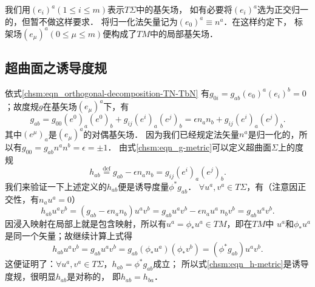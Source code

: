 

我们用$(e_i)^a (1\leqslant i \leqslant m)$表示$T\Sigma$中的基矢场，
如有必要将$(e_i)^a$选为正交归一的，但暂不做这样要求．
将归一化法矢量记为$(e_0)^a\equiv {n}^a$．在这样约定下，
标架场$(e_\mu)^a (0\leqslant \mu \leqslant m)$便构成了$TM$中的局部基矢场．




\subsection{超曲面之诱导度规}
依式\eqref{chsm:eqn_orthogonal-decomposition-TN-TbN}
有$g_{0i}={g}_{ab}(e_0)^a (e_i)^b=0$；故度规$g$在基矢场$(e_\mu)^a$下，有
\begin{equation}\label{chsm:eqn_g-metric}
    g_{ab}= g_{00} (e^0)_a(e^0)_b + g_{ij} (e^i)_a(e^j)_b
    = \epsilon n_a n_b + g_{ij} (e^i)_a(e^j)_b.
\end{equation}
其中$(e^\mu)_a$是$(e_\mu)^a$的对偶基矢场．
因为我们已经规定法矢量${n}^a$是归一化的，所以有$g_{00}={g}_{ab}{n}^a {n}^b=\epsilon=\pm 1$．
由式\eqref{chsm:eqn_g-metric}可以定义超曲面$\Sigma$上的度规
\begin{equation}\label{chsm:eqn_h-metric}
    h_{ab} \overset{\mathrm {def}}{=} g_{ab}- \epsilon {n}_a {n}_b = g_{ij} (e^i)_a(e^j)_b.
\end{equation}
我们来验证一下上述定义的$h_{ab}$便是诱导度量$\phi^* g_{ab}$．
$\forall u^a, v^a \in T\Sigma$，有（注意因正交性，有${n}_au^a=0$）
\begin{equation}
    h_{ab}u^a v^b = (g_{ab}-\epsilon{n}_a {n}_b)u^a v^b
      =  g_{ab}u^a v^b -\epsilon {n}_au^a \, {n}_b v^b = g_{ab}u^a v^b .
\end{equation}
因浸入映射在局部上就是包含映射，所以有$u^a=\phi_{*}u^a\in TM$，即在$TM$中
$u^a$和$\phi_{*}u^a$是同一个矢量；故继续计算上式得
\begin{equation}
    h_{ab}u^a v^b =g_{ab}u^a v^b = g_{ab}(\phi_{*}u^a) (\phi_{*}v^b)=(\phi^{*}g_{ab})u^a v^b.
\end{equation}
这便证明了：$\forall u^a, v^a \in T\Sigma$，$h_{ab}=\phi^* g_{ab}$成立；
所以式\eqref{chsm:eqn_h-metric}是诱导度规，很明显$h_{ab}$是对称的，
即$h_{ab}=h_{ba}$．


